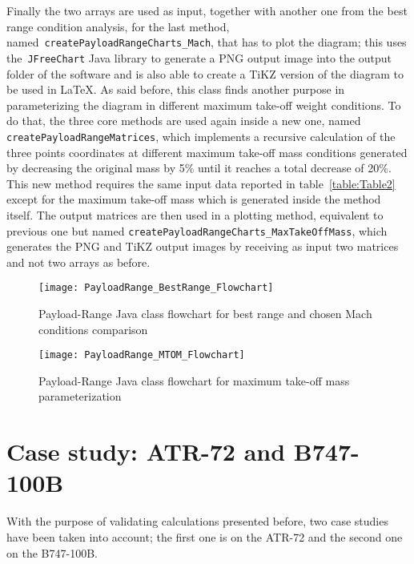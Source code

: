 \bigskip
\noindent
Finally the two arrays are used as input, together with another one from the best range condition analysis, for the last method, named~\lstinline[language=Java]!createPayloadRangeCharts_Mach!, that has to plot the diagram; this uses the~\lstinline[language=Java]!JFreeChart! Java library\cite{jfreechart} to generate a \gls{PNG} output image into the output folder of the software and is also able to create a \gls{TiKZ} version of the diagram to be used in \LaTeX.
%
As said before, this class finds another purpose in parameterizing the diagram in different maximum take-off weight conditions. To do that, the three core methods are used again inside a new one, named \lstinline[language=Java]!createPayloadRangeMatrices!, which implements a recursive calculation of the three points coordinates at different maximum take-off mass conditions generated by decreasing the original mass by 5$\%$ until it reaches a total decrease of 20$\%$. This new method requires the same input data reported in table~\ref{table:Table2} except for the maximum take-off mass which is generated inside the method itself. The output matrices are then used in a plotting method, equivalent to previous one but named \lstinline[language=Java]!createPayloadRangeCharts_MaxTakeOffMass!, which generates the \gls{PNG} and \gls{TiKZ} output images by receiving as input two matrices and not two arrays as before.

\bigskip
\begin{figure}[H]
\centering
\texttt{[image: PayloadRange\_BestRange\_Flowchart]}
\caption{Payload-Range Java class flowchart for best range and chosen Mach conditions comparison}
\label{fig:Figure3}
\end{figure}

\bigskip
\begin{figure}[H]
\centering
\texttt{[image: PayloadRange\_MTOM\_Flowchart]}
\caption{Payload-Range Java class flowchart for maximum take-off mass parameterization}
\label{fig:Figure4}
\end{figure}
%
%
\section{Case study: ATR-72 and B747-100B}
With the purpose of validating calculations presented before, two case studies have been taken into account; the first one is on the ATR-72 and the second one on the B747-100B.

